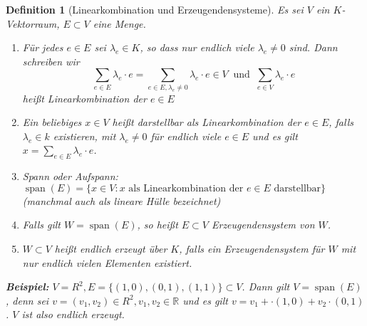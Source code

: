 \documentclass{report}
\newcommand{\lb}{\lambda}
\newcommand{\R}{\mathbb{R}}
\DeclareMathOperator{\Span}{span}
\theoremstyle{customrem}
\theoremstyle{customdef}
\newtheorem{definition}{Definition}[chapter]
\begin{document}
	\begin{definition}[Linearkombination und Erzeugendensysteme]
		Es sei \(V\) ein \(K\)-Vektorraum, \(E \subset V\) eine Menge.
		
		\begin{enumerate}
			\item Für jedes \(e \in E\) sei \(\lb_e \in K\), so dass nur endlich viele \(\lb_e \neq 0\) sind. Dann schreiben wir \[\sum_{e \in E}\lb_e \cdot e = \sum_{e\in E, \lb_e \neq 0} \lb_e \cdot e \in V\ \text{ und }\ \sum_{e \in V} \lb_e \cdot e\] heißt Linearkombination der \(e \in E\)
			\item Ein beliebiges \(x \in V\) heißt darstellbar als Linearkombination der \(e \in E\), falls \(\lb_e \in k\) existieren, mit \(\lb_e \neq 0\) für endlich viele \(e \in E\) und es gilt \(x = \sum_{e \in E}\lb_e \cdot e\).
			\item Spann oder Aufspann: \(\Span(E) = \{x \in V : x \text{ als Linearkombination der } e \in E \text{ darstellbar}\}\) (manchmal auch als lineare Hülle bezeichnet)
			\item Falls gilt \(W = \Span(E)\), so heißt \(E \subset V\) Erzeugendensystem von \(W\).
			\item \(W \subset V\) heißt endlich erzeugt über \(K\), falls ein Erzeugendensystem für \(W\) mit nur endlich vielen Elementen existiert.
		\end{enumerate}
		\textbf{Beispiel: } 
		\(V = R^2, E = \{(1, 0), (0, 1), (1, 1)\} \subset V\). Dann gilt \(V = \Span(E)\), denn sei \(v = (v_1, v_2) \in R^2, v_1, v_2 \in \R\) und es gilt \(v = v_1 + \cdot (1, 0) + v_2 \cdot (0, 1)\). \(V\) ist also endlich erzeugt.
		
	\end{definition}
	
\end{document}
